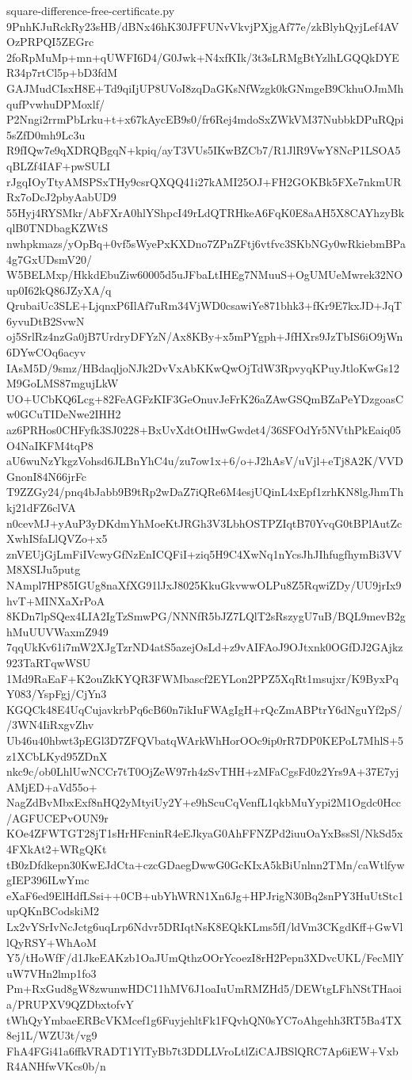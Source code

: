 \documentclass[11pt]{article}
\theoremstyle{definition}
\theoremstyle{remark}
\begin{document}
\begin{filecontents*}[overwrite]{square-difference-free-certificate.py}
9PnhKJuRckRy23sHB/dBNx46hK30JFFUNvVkvjPXjgAf77e/zkBlyhQyjLef4AVOzPRPQI5ZEGrc
2foRpMuMp+mn+qUWFI6D4/G0Jwk+N4xfKIk/3t3sLRMgBtYzlhLGQQkDYER34p7rtCl5p+bD3fdM
GAJMudCIsxH8E+Td9qiIjUP8UVoI8zqDaGKsNfWzgk0kGNmgeB9CkhuOJmMhqufPvwhuDPMoxlf/
P2Nngi2rrmPbLrku+t+x67kAycEB9s0/fr6Rej4mdoSxZWkVM37NubbkDPuRQpi5sZfD0mh9Lc3u
R9fIQw7e9qXDRQBgqN+kpiq/ayT3VUs5IKwBZCb7/R1JlR9VwY8NcP1LSOA5qBLZf4IAF+pwSULI
rJgqIOyTtyAMSPSxTHy9csrQXQQ41i27kAMI25OJ+FH2GOKBk5FXe7nkmURRx7oDcJ2pbyAabUD9
55Hyj4RYSMkr/AbFXrA0hlYShpcI49rLdQTRHkeA6FqK0E8aAH5X8CAYhzyBkqlB0TNDbagKZWtS
nwhpkmazs/yOpBq+0vf5sWyePxKXDno7ZPnZFtj6vtfvc3SKbNGy0wRkiebmBPa4g7GxUDsmV20/
W5BELMxp/HkkdEbuZiw60005d5uJFbaLtIHEg7NMuuS+OgUMUeMwrek32NOup0I62kQ86JZyXA/q
QrubaiUc3SLE+LjqnxP6IlAf7uRm34VjWD0csawiYe871bhk3+fKr9E7kxJD+JqT6yvuDtB2SvwN
oj5SrlRz4nzGa0jB7UrdryDFYzN/Ax8KBy+x5mPYgph+JfHXrs9JzTbIS6iO9jWn6DYwCOq6acyv
IAsM5D/9smz/HBdaqljoNJk2DvVxAbKKwQwOjTdW3RpvyqKPuyJtloKwGs12M9GoLMS87mgujLkW
UO+UCbKQ6Lcg+82FeAGFzKIF3GeOnuvJeFrK26aZAwGSQmBZaPeYDzgoasCw0GCuTIDeNwe2IHH2
az6PRHos0CHFyfk3SJ0228+BxUvXdtOtIHwGwdet4/36SFOdYr5NVthPkEaiq05O4NaIKFM4tqP8
aU6wuNzYkgzVohsd6JLBnYhC4u/zu7ow1x+6/o+J2hAsV/uVjl+eTj8A2K/VVDGnonI84N66jrFc
T9ZZGy24/pnq4bJabb9B9tRp2wDaZ7iQRe6M4esjUQinL4xEpf1zrhKN8lgJhmThkj21dFZ6clVA
n0cevMJ+yAuP3yDKdmYhMoeKtJRGh3V3LbhOSTPZIqtB70YvqG0tBPlAutZcXwhISfaLlQVZo+x5
znVEUjGjLmFiIVcwyGfNzEnICQFiI+ziq5H9C4XwNq1nYcsJhJIhfugfhymBi3VVM8XSIJu5putg
NAmpl7HP85IGUg8naXfXG91lJxJ8025KkuGkvwwOLPu8Z5RqwiZDy/UU9jrIx9hvT+MINXaXrPoA
8KDn7lpSQex4LIA2IgTzSmwPG/NNNfR5bJZ7LQlT2sRszygU7uB/BQL9mevB2ghMuUUVWaxmZ949
7qqUkKv61i7mW2XJgTzrND4atS5azejOsLd+z9vAIFAoJ9OJtxnk0OGfDJ2GAjkz923TaRTqwWSU
1Md9RaEaF+K2ouZkKYQR3FWMbascf2EYLon2PPZ5XqRt1msujxr/K9ByxPqY083/YspFgj/CjYn3
KGQCk48E4UqCujavkrbPq6cB60n7ikIuFWAgIgH+rQcZmABPtrY6dNguYf2pS//3WN4IiRxgvZhv
Ub46u40hbwt3pEGl3D7ZFQVbatqWArkWhHorOOc9ip0rR7DP0KEPoL7MhlS+5z1XCbLKyd95ZDnX
nkc9c/ob0LhlUwNCCr7tT0OjZeW97rh4zSvTHH+zMFaCgsFd0z2Yrs9A+37E7yjAMjED+aVd55o+
NagZdBvMbxExf8nHQ2yMtyiUy2Y+e9hScuCqVenfL1qkbMuYypi2M1Ogdc0Hcc/AGFUCEPvOUN9r
KOe4ZFWTGT28jT1sHrHFcninR4eEJkyaG0AhFFNZPd2iuuOaYxBssSl/NkSd5x4FXkAt2+WRgQKt
tB0zDfdkepn30KwEJdCta+czcGDaegDwwG0GcKIxA5kBiUnlnn2TMn/caWtlfywgIEP396ILwYmc
eXaF6ed9ElHdfLSsi++0CB+ubYhWRN1Xn6Jg+HPJrigN30Bq2snPY3HuUtStc1upQKnBCodskiM2
Lx2vYSrIvNcJctg6uqLrp6Ndvr5DRIqtNsK8EQkKLms5fI/ldVm3CKgdKff+GwVllQyRSY+WhAoM
Y5/tHoWfF/d1JkeEAKzb1OaJUmQthzOOrYcoezI8rH2Pepn3XDvcUKL/FecMlYuW7VHn2lmp1fo3
Pm+RxGud8gW8zwunwHDC11hMV6J1oaIuUmRMZHd5/DEWtgLFhNStTHaoia/PRUPXV9QZDbxtofvY
tWhQyYmbaeERBcVKMcef1g6FuyjehltFk1FQvhQN0sYC7oAhgehh3RT5Ba4TX8ej1L/WZU3t/vg9
FhA4FGi41a6ffkVRADT1YlTyBb7t3DDLLVroLtlZiCAJBSlQRC7Ap6iEW+VxbR4ANHfwVKcs0b/n

\end{filecontents*}
\end{document}
